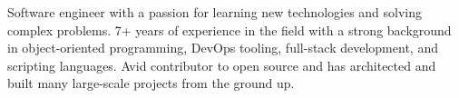 

\begin{cvparagraph}

Software engineer with a passion for learning new technologies and solving complex problems. 7+ years of experience in the field with a strong background in object-oriented programming, DevOps tooling, full-stack development, and scripting languages. Avid contributor to open source and has architected and built many large-scale projects from the ground up. 
\end{cvparagraph}
